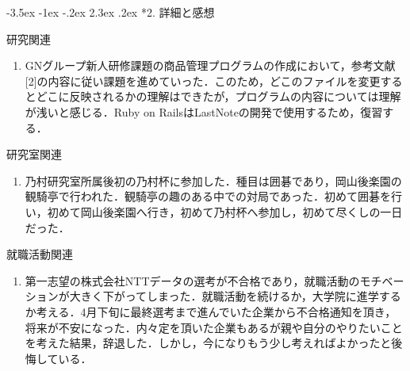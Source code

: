 \documentclass[fleqn, 14pt]{extarticlej}
\makeatletter
\renewcommand\labelenumi{(\theenumi)}
\def\section{\@startsection {section}{1}{\z@}%
{-3.5ex \@plus -1ex \@minus -.2ex}%
{2.3ex \@plus.2ex}%
{\sectionformat}}
\def\sectionformat{\normalsize}
\makeatother
\begin{document}
\vspace{-1.5em}
\section*{2. 詳細と感想}
\vspace{-1.0em}

\begin{description}
  \itemsep -1mm

\item[　2.1] 研究関連
  \vspace{-0.8em}
  \begin{enumerate}
    \renewcommand{\labelenumi}{(1-B)}
  \item GNグループ新人研修課題の商品管理プログラムの作成において，参考文献[2]の内容に従い課題を進めていった．このため，どこのファイルを変更するとどこに反映されるかの理解はできたが，プログラムの内容については理解が浅いと感じる．Ruby on RailsはLastNoteの開発で使用するため，復習する．
  \end{enumerate}

  \vspace{-0.5em}
  \item[　2.2] 研究室関連
    \vspace{-1.0em}
    \begin{enumerate}
      \renewcommand{\labelenumi}{(3)}
    \item 乃村研究室所属後初の乃村杯に参加した．種目は囲碁であり，岡山後楽園の観騎亭で行われた．観騎亭の趣のある中での対局であった．初めて囲碁を行い，初めて岡山後楽園へ行き，初めて乃村杯へ参加し，初めて尽くしの一日だった．
    
    \end{enumerate}
    
  \vspace{-0.5em}
  \item[　2.4] 就職活動関連
    \vspace{-1.0em}
    \begin{enumerate}
      \renewcommand{\labelenumi}{(4)}
    \item 第一志望の株式会社NTTデータの選考が不合格であり，就職活動のモチベーションが大きく下がってしまった．就職活動を続けるか，大学院に進学するか考える．4月下旬に最終選考まで進んでいた企業から不合格通知を頂き，将来が不安になった．内々定を頂いた企業もあるが親や自分のやりたいことを考えた結果，辞退した．しかし，今になりもう少し考えればよかったと後悔している．

    
    \end{enumerate}

\end{description}
\end{document}
